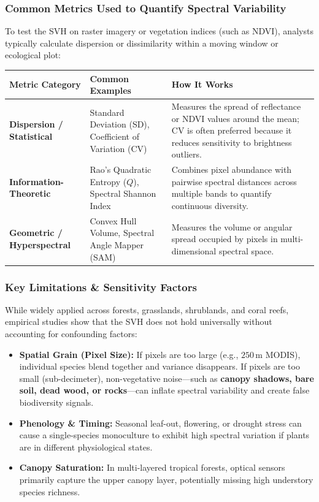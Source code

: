 \documentclass[12pt, letterpaper]{article}
\begin{document}
\subsubsection*{Common Metrics Used to Quantify Spectral Variability}

To test the SVH on raster imagery or vegetation indices (such as NDVI), analysts typically calculate dispersion or dissimilarity within a moving window or ecological plot:

\begin{table}[h!]
\centering
\renewcommand{\arraystretch}{1.35}
\begin{tabularx}{\textwidth}{>{\raggedright\arraybackslash}p{} >{\raggedright\arraybackslash}p{} >{\raggedright\arraybackslash}X}
\toprule
\textbf{Metric Category} & \textbf{Common Examples} & \textbf{How It Works} \\
\midrule
\textbf{Dispersion / Statistical} & Standard Deviation (SD), Coefficient of Variation (CV) & Measures the spread of reflectance or NDVI values around the mean; CV is often preferred because it reduces sensitivity to brightness outliers. \\
\textbf{Information-Theoretic} & Rao's Quadratic Entropy ($Q$), Spectral Shannon Index & Combines pixel abundance with pairwise spectral distances across multiple bands to quantify continuous diversity. \\
\textbf{Geometric / Hyperspectral} & Convex Hull Volume, Spectral Angle Mapper (SAM) & Measures the volume or angular spread occupied by pixels in multi-dimensional spectral space. \\
\bottomrule
\end{tabularx}
\end{table}

\subsubsection*{Key Limitations \& Sensitivity Factors}

While widely applied across forests, grasslands, shrublands, and coral reefs, empirical studies show that the SVH does not hold universally without accounting for confounding factors:

\begin{itemize}
    \item \textbf{Spatial Grain (Pixel Size):} If pixels are too large (e.g., $250\,\text{m}$ MODIS), individual species blend together and variance disappears. If pixels are too small (sub-decimeter), non-vegetative noise---such as \textbf{canopy shadows, bare soil, dead wood, or rocks}---can inflate spectral variability and create false biodiversity signals.
    \item \textbf{Phenology \& Timing:} Seasonal leaf-out, flowering, or drought stress can cause a single-species monoculture to exhibit high spectral variation if plants are in different physiological states.
    \item \textbf{Canopy Saturation:} In multi-layered tropical forests, optical sensors primarily capture the upper canopy layer, potentially missing high understory species richness.
\end{itemize}
\end{document}
